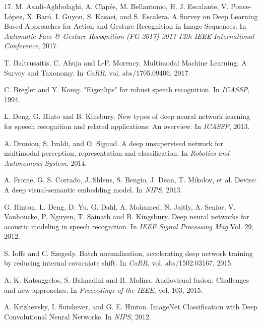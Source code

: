 \begin{thebibliography}{99}

  17. M. Asadi-Aghbolaghi, A. Clapés, M. Bellantonio, H. J. Escalante, 
  V. Ponce-López, X. Baró, I. Guyon, S. Kasaei, and S. Escalera. 
  A Survey on Deep Learning Based Approaches for Action and Gesture 
  Recognition in Image Sequences. 
  In \textit{Automatic Face \& Gesture Recognition (FG 2017) 2017 12th IEEE
  International Conference}, 2017.

  T. Baltrusaitis, C. Ahuja and L-P. Morency. Multimodal Machine Learning:
  A Survey and Taxonomy. In \textit{CoRR}, vol. abs/1705.09406, 2017.

  C. Bregler and Y. Konig. "Eigenlips" for robust speech recognition.
  In \textit{ICASSP}, 1994.

  L. Deng, G. Hinto and B. Kinsbury. New types of deep neural network
  learning for speech recognition and related applications: An overview.
  In \textit{ICASSP}, 2013.

  A. Droniou, S. Ivaldi, and O. Sigaud. A deep unsupervised network
  for multimodal perception, representation and classification. In
  \textit{Robotics and Autonomous System}, 2014.

  A. Frome, G. S. Corrado, J. Shlens, S. Bengio, J. Dean,
  T. Mikolov, et al. Devise: A deep visual-semantic embedding model. 
  In \textit{NIPS}, 2013.

  G. Hinton, L. Deng, D. Yu, G. Dahl, A. Mohamed, N. Jaitly, A. Senior, V.
  Vanhoucke, P. Nguyen, T. Sainath and B. Kingsbury. Deep neural networks
  for acoustic modeling in speech recognition.
  In \textit{IEEE Signal Processing Mag} Vol. 29, 2012.

  S. Ioffe and C. Szegedy. Batch normalization, accelerating deep network
  training by reducing internal covaraiate shift. In \textit{CoRR},
  vol. abs/1502.03167, 2015.

  A. K. Katsaggelos, S. Bahaadini and R. Molina. Audiovisual fusion:
  Challenges and new approaches. In \textit{Proceedings of the IEEE},
  vol. 103, 2015.

  A. Krizhevsky, I. Sutskever, and G. E. Hinton.  ImageNet Classification
  with Deep Convolutional Neural Networks. In \textit{NIPS}, 2012.


\end{thebibliography}
